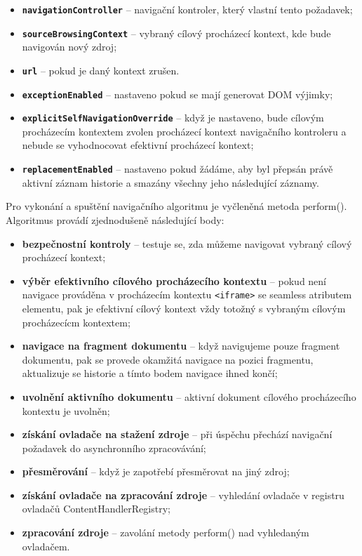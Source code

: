 \begin{itemize}
  \item \textbf{\texttt{navigationController}} -- navigační kontroler, který vlastní tento požadavek;
  \item \textbf{\texttt{sourceBrowsingContext}} -- vybraný cílový procházecí kontext, kde bude navigován nový zdroj;
  \item \textbf{\texttt{url}} -- pokud je daný kontext zrušen. 
  \item \textbf{\texttt{exceptionEnabled}} -- nastaveno pokud se mají generovat DOM výjimky;
  \item \textbf{\texttt{explicitSelfNavigationOverride}} -- když je nastaveno, bude cílovým procházecím kontextem zvolen procházecí kontext navigačního kontroleru a nebude se vyhodnocovat efektivní procházecí kontext;
  \item \textbf{\texttt{replacementEnabled}} -- nastaveno pokud žádáme, aby byl přepsán právě aktivní záznam historie a smazány všechny jeho následující záznamy.
\end{itemize}

Pro vykonání a spuštění navigačního algoritmu je vyčleněná metoda perform(). Algoritmus provádí zjednodušeně následující body:

\begin{itemize}
  \item \textbf{bezpečnostní kontroly} -- testuje se, zda můžeme navigovat vybraný cílový procházecí kontext;
  \item \textbf{výběr efektivního cílového procházecího kontextu} -- pokud není navigace prováděna v procházecím kontextu \texttt{<iframe>} se seamless atributem elementu, pak je efektivní cílový kontext vždy totožný s vybraným cílovým procházecícm kontextem;
  \item \textbf{navigace na fragment dokumentu} -- když navigujeme pouze fragment dokumentu, pak se provede okamžitá navigace na pozici fragmentu, aktualizuje se historie a tímto bodem navigace ihned končí; 
  \item \textbf{uvolnění aktivního dokumentu} -- aktivní dokument cílového procházecího kontextu je uvolněn;
  \item \textbf{získání ovladače na stažení zdroje} -- při úspěchu přechází navigační požadavek do asynchronního zpracovávání;
  \item \textbf{přesměrování} -- když je zapotřebí přesměrovat na jiný zdroj;
  \item \textbf{získání ovladače na zpracování zdroje} -- vyhledání ovladače v registru ovladačů ContentHandlerRegistry; 
  \item \textbf{zpracování zdroje} -- zavolání metody perform() nad vyhledaným ovladačem.
\end{itemize}

